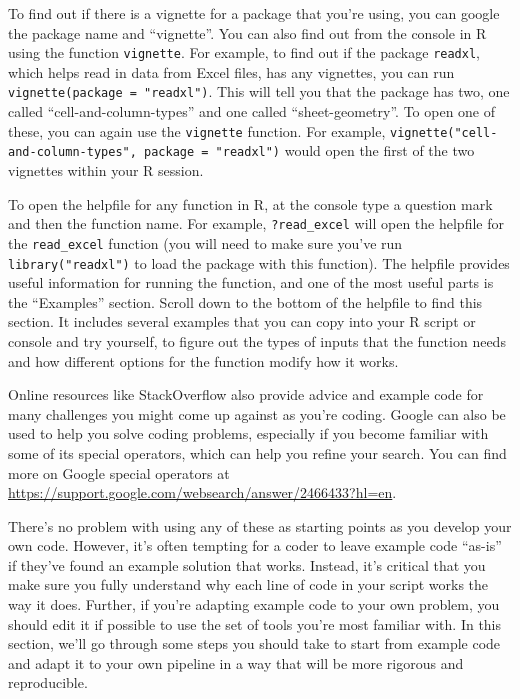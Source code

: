 \documentclass[]{tufte-book}
\begin{document}
To find out if there is a vignette for a package that you're using, you can
google the package name and ``vignette''. You can also find out from the console
in R using the function \texttt{vignette}. For example, to find out if the package
\texttt{readxl}, which helps read in data from Excel files, has any vignettes, you can
run \texttt{vignette(package\ =\ "readxl")}. This will tell you that the package has two,
one called ``cell-and-column-types'' and one called ``sheet-geometry''. To open one
of these, you can again use the \texttt{vignette} function. For example,
\texttt{vignette("cell-and-column-types",\ package\ =\ "readxl")} would open the first of
the two vignettes within your R session.

To open the helpfile for any function in R, at the console type a question mark
and then the function name. For example, \texttt{?read\_excel} will open the helpfile
for the \texttt{read\_excel} function (you will need to make sure you've run
\texttt{library("readxl")} to load the package with this function). The helpfile
provides useful information for running the function, and one of the most useful
parts is the ``Examples'' section. Scroll down to the bottom of the helpfile to
find this section. It includes several examples that you can copy into your R
script or console and try yourself, to figure out the types of inputs that the
function needs and how different options for the function modify how it works.

Online resources like StackOverflow also provide advice and example code for
many challenges you might come up against as you're coding. Google can also be
used to help you solve coding problems, especially if you become familiar with
some of its special operators, which can help you refine your search. You can
find more on Google special operators at
\url{https://support.google.com/websearch/answer/2466433?hl=en}.

There's no problem with using any of these as starting points as you develop
your own code. However, it's often tempting for a coder to leave
example code ``as-is'' if they've found an example solution that works. Instead,
it's critical that you make sure you fully understand why each line of code in
your script works the way it does. Further, if you're adapting example code to
your own problem, you should edit it if possible to use the set of tools you're
most familiar with. In this section, we'll go through some steps you should
take to start from example code and adapt it to your own pipeline in a way
that will be more rigorous and reproducible.
\end{document}
